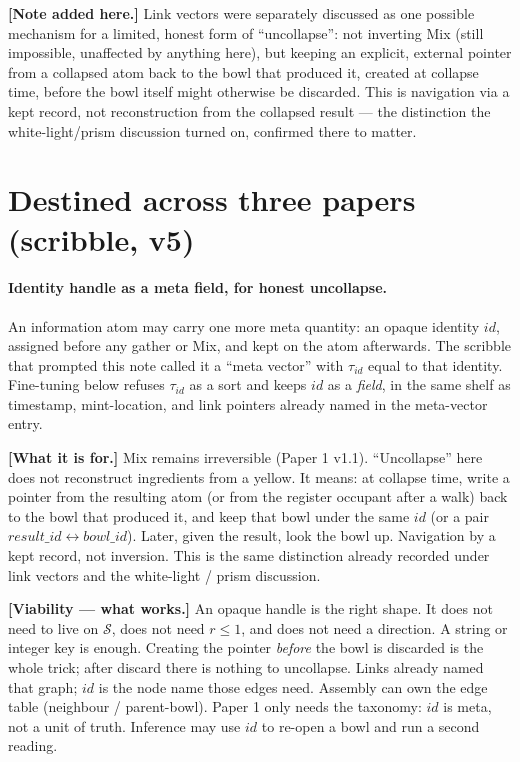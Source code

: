 \documentclass[11pt]{article}
\begin{document}
\textbf{[Note added here.]} Link vectors were separately discussed as
one possible mechanism for a limited, honest form of ``uncollapse'':
not inverting Mix (still impossible, unaffected by anything here),
but keeping an explicit, external pointer from a collapsed atom back
to the bowl that produced it, created at collapse time, before the
bowl itself might otherwise be discarded. This is navigation via a
kept record, not reconstruction from the collapsed result --- the
distinction the white-light/prism discussion turned on, confirmed
there to matter.

\section{Destined across three papers (scribble, v5)}

\paragraph{Identity handle as a meta field, for honest uncollapse.}
An information atom may carry one more meta quantity: an opaque
identity $id$, assigned before any gather or Mix, and kept on the
atom afterwards. The scribble that prompted this note called it a
``meta vector'' with $\tau_{id}$ equal to that identity. Fine-tuning
below refuses $\tau_{id}$ as a sort and keeps $id$ as a \emph{field},
in the same shelf as timestamp, mint-location, and link pointers
already named in the meta-vector entry.

\textbf{[What it is for.]} Mix remains irreversible (Paper 1 v1.1).
``Uncollapse'' here does not reconstruct ingredients from a yellow.
It means: at collapse time, write a pointer from the resulting atom
(or from the register occupant after a walk) back to the bowl that
produced it, and keep that bowl under the same $id$ (or a pair
$result\_id \leftrightarrow bowl\_id$). Later, given the result, look
the bowl up. Navigation by a kept record, not inversion. This is the
same distinction already recorded under link vectors and the
white-light / prism discussion.

\textbf{[Viability --- what works.]}
An opaque handle is the right shape. It does not need to live on
$\mathcal{S}$, does not need $r\le 1$, and does not need a direction.
A string or integer key is enough. Creating the pointer \emph{before}
the bowl is discarded is the whole trick; after discard there is
nothing to uncollapse. Links already named that graph; $id$ is the
node name those edges need. Assembly can own the edge table
(neighbour / parent-bowl). Paper 1 only needs the taxonomy: $id$ is
meta, not a unit of truth. Inference may use $id$ to re-open a bowl
and run a second reading.
\end{document}
